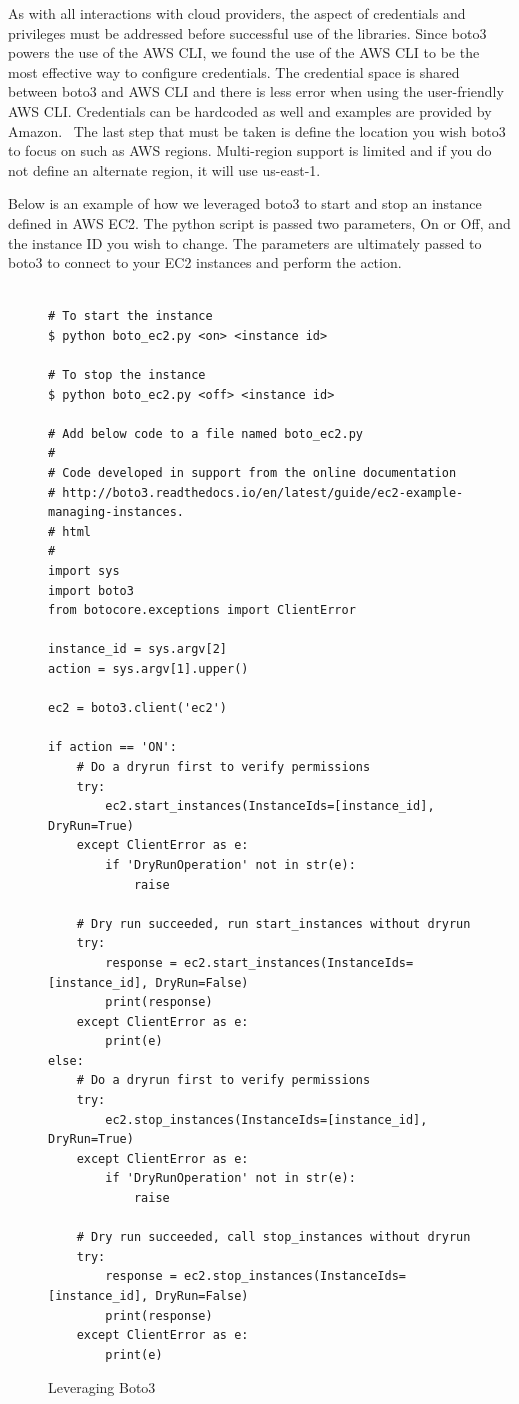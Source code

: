 As with all interactions with cloud providers, the aspect of credentials and
privileges must be addressed before successful use of the libraries. Since boto3
powers the use of the AWS CLI, we found the use of the AWS CLI to be the most
effective way to configure credentials. The credential space is shared between
boto3 and AWS CLI and there is less error when using the user-friendly AWS CLI.
Credentials can be hardcoded as well and examples are provided by
Amazon.~\cite{hid-sp18-518-Boto3} The last step that must be taken is define the
location you wish boto3 to focus on such as AWS regions. Multi-region support is
limited and if you do not define an alternate region, it will use us-east-1.

Below is an example of how we leveraged boto3 to start and stop an instance
defined in AWS EC2. The python script is passed two parameters, On or Off, and
the instance ID you wish to change. The parameters are ultimately passed to
boto3 to connect to your EC2 instances and perform the action.

\begin{figure}[htb]

\begin{verbatim}

# To start the instance
$ python boto_ec2.py <on> <instance id>

# To stop the instance
$ python boto_ec2.py <off> <instance id>

# Add below code to a file named boto_ec2.py
# 
# Code developed in support from the online documentation
# http://boto3.readthedocs.io/en/latest/guide/ec2-example-managing-instances.
# html
# 
import sys
import boto3
from botocore.exceptions import ClientError

instance_id = sys.argv[2]
action = sys.argv[1].upper()

ec2 = boto3.client('ec2')

if action == 'ON':
    # Do a dryrun first to verify permissions
    try:
        ec2.start_instances(InstanceIds=[instance_id], DryRun=True)
    except ClientError as e:
        if 'DryRunOperation' not in str(e):
            raise

    # Dry run succeeded, run start_instances without dryrun
    try:
        response = ec2.start_instances(InstanceIds=[instance_id], DryRun=False)
        print(response)
    except ClientError as e:
        print(e)
else:
    # Do a dryrun first to verify permissions
    try:
        ec2.stop_instances(InstanceIds=[instance_id], DryRun=True)
    except ClientError as e:
        if 'DryRunOperation' not in str(e):
            raise

    # Dry run succeeded, call stop_instances without dryrun
    try:
        response = ec2.stop_instances(InstanceIds=[instance_id], DryRun=False)
        print(response)
    except ClientError as e:
        print(e)

\end{verbatim}

\caption{Leveraging Boto3~\cite{hid-sp18-518-Boto3}}\label{c:boto3-example}

\end{figure}

